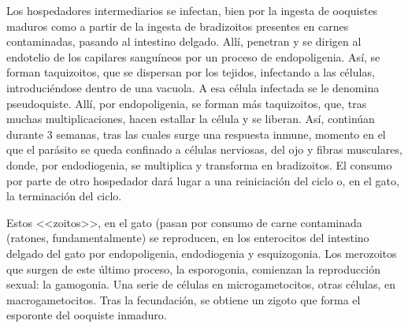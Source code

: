 Los hospedadores intermediarios se infectan, bien por la ingesta de ooquistes maduros como a partir de la ingesta de bradizoitos presentes en carnes contaminadas, pasando al intestino delgado. Allí, penetran y se dirigen al endotelio de los capilares sanguíneos por un proceso de endopoligenia. Así, se forman taquizoitos, que se dispersan por los tejidos, infectando a las células, introduciéndose dentro de una vacuola. A esa célula infectada se le denomina pseudoquiste. Allí, por endopoligenia, se forman más taquizoitos, que, tras muchas multiplicaciones, hacen estallar la célula y se liberan. Así, continúan durante 3 semanas, tras las cuales surge una respuesta inmune, momento en el que el parásito se queda confinado a células nerviosas, del ojo y fibras musculares, donde, por endodiogenia, se multiplica y transforma en bradizoitos. El consumo por parte de otro hospedador dará lugar a una reiniciación del ciclo o, en el gato, la terminación del ciclo.

Estos <<zoitos>>, en el gato (pasan por consumo de carne contaminada (ratones, fundamentalmente) se reproducen, en los enterocitos del intestino delgado del gato por endopoligenia, endodiogenia y esquizogonia. Los merozoitos que surgen de este último proceso, la esporogonia, comienzan la reproducción sexual: la gamogonia. Una serie de células en microgametocitos, otras células, en macrogametocitos. Tras la fecundación, se obtiene un zigoto que forma el esporonte del ooquiste inmaduro.


